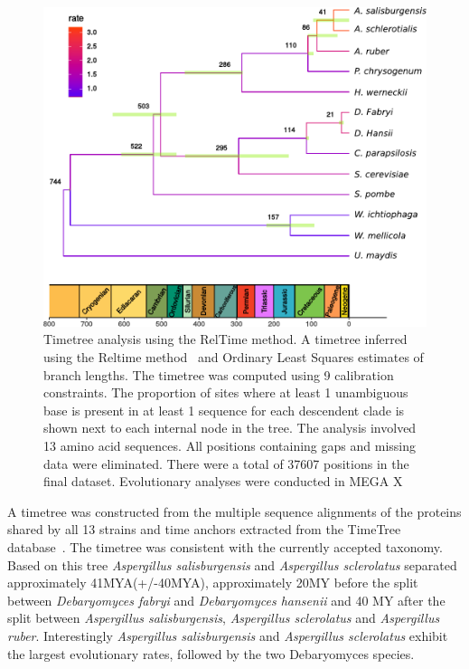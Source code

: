 \documentclass[jof,article,submit,moreauthors,pdftex,10pt,a4paper]{Definitions/mdpi}
\newcommand{\aspRub}{\textit{Aspergillus ruber}}
\newcommand{\debFab}{\textit{Debaryomyces fabryi}}
\newcommand{\debHan}{\textit{Debaryomyces hansenii}}
\newcommand{\phiSp}{\textit{Aspergillus salisburgensis}}
\newcommand{\phiScl}{\textit{Aspergillus sclerolatus}}
\begin{document}
\begin{figure}[htbp]
  \centering
  \includegraphics[width=0.9\linewidth]{./geophyloTree.pdf}
  \caption{\label{fig:gainLossTree}  Timetree analysis using the RelTime method. A timetree inferred using the Reltime method~\cite{Tamura2018, Tamura2012} and Ordinary Least Squares estimates of branch lengths. The timetree was computed using 9 calibration constraints. The proportion of sites where at least 1 unambiguous base is present in at least 1 sequence for each descendent clade is shown next to each internal node in the tree. The analysis involved 13 amino acid sequences. All positions containing gaps and missing data were eliminated. There were a total of 37607 positions in the final dataset. Evolutionary analyses were conducted in MEGA X~\cite{Kumar2018}}
\end{figure}

A timetree was constructed from the multiple sequence alignments of the proteins shared by all 13 strains and time anchors extracted from  the TimeTree database~\cite{Kumar2017}. The timetree was consistent with the currently accepted taxonomy. Based on this tree \phiSp{} and \phiScl{} separated approximately 41MYA(+/-40MYA), approximately 20MY before the split between \debFab{} and \debHan{} and 40 MY after the split between \phiSp{}, \phiScl{} and \aspRub{}. Interestingly \phiSp{} and \phiScl{} exhibit the largest evolutionary rates, followed by the two Debaryomyces species.
\end{document}

